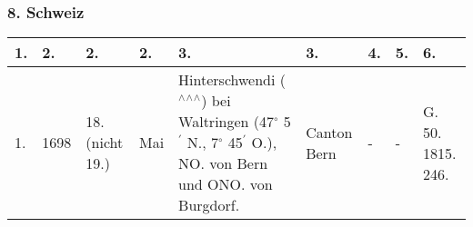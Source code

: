 \documentclass[a4paper, 11pt, oneside, polutonikogreek, german]{article}
\begin{document}
\clearpage
\begin{landscape}
\subsubsection{8. Schweiz}
\begin{table}[!ht]
    \centering
    \begin{tabular}{|l|l|l|l|l|l|l|l|l|}
    \hline
        1. & 2. & 2. & 2. & 3. & 3. & 4. & 5. & 6. \\ \hline
        1. & 1698 & 18. (nicht 19.) & Mai & Hinterschwendi ($^\wedge$$^\wedge$$^\wedge$) bei Waltringen (47$^\circ$ 5$^\prime$ N., 7$^\circ$ 45$^\prime$ O.), NO. von Bern und ONO. von Burgdorf. & Canton Bern & - & - & G. 50. 1815. 246. \\ \hline
    \end{tabular}
\end{table}
\end{landscape}
\clearpage
\end{document}
